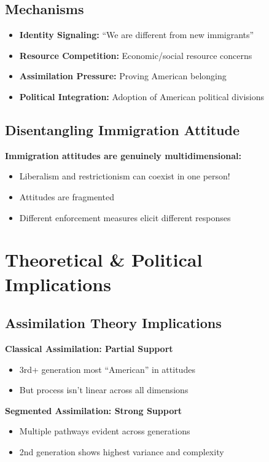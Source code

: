 \documentclass[11pt,letterpaper]{article}
\begin{document}
\subsection{Mechanisms}
\begin{itemize}
    \item \textbf{Identity Signaling:} ``We are different from new immigrants''
    \item \textbf{Resource Competition:} Economic/social resource concerns
    \item \textbf{Assimilation Pressure:} Proving American belonging
    \item \textbf{Political Integration:} Adoption of American political divisions
\end{itemize}

\subsection{Disentangling Immigration Attitude}

\textbf{Immigration attitudes are genuinely multidimensional:}
\begin{itemize}
    \item Liberalism and restrictionism can coexist in one person!
    \item Attitudes are fragmented
    \item Different enforcement measures elicit different responses
\end{itemize}

\section{Theoretical \& Political Implications}

\subsection{Assimilation Theory Implications}

\textbf{Classical Assimilation: Partial Support}
\begin{itemize}
    \item 3rd+ generation most ``American'' in attitudes
    \item But process isn't linear across all dimensions
\end{itemize}

\textbf{Segmented Assimilation: Strong Support}
\begin{itemize}
    \item Multiple pathways evident across generations
    \item 2nd generation shows highest variance and complexity
\end{itemize}
\end{document}

